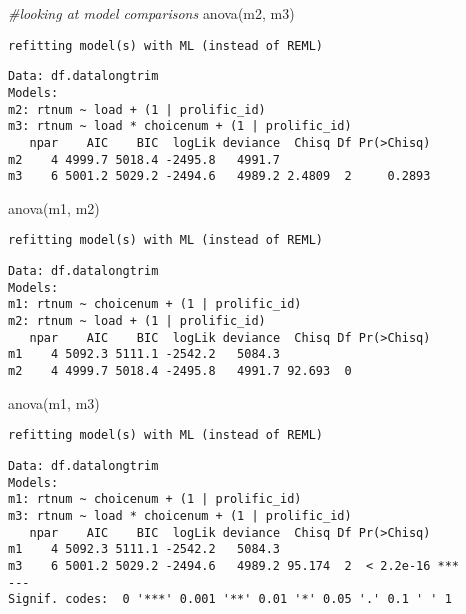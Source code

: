\documentclass[
]{article}
\newenvironment{Shaded}{\begin{snugshade}}{\end{snugshade}}
\newcommand{\CommentTok}[1]{\textcolor[rgb]{0.56,0.35,0.01}{\textit{#1}}}
\newcommand{\FunctionTok}[1]{\textcolor[rgb]{0.00,0.00,0.00}{#1}}
\newcommand{\NormalTok}[1]{#1}
\begin{document}
\begin{Shaded}
\begin{Highlighting}[]
\CommentTok{\#looking at model comparisons}
\FunctionTok{anova}\NormalTok{(m2, m3)}
\end{Highlighting}
\end{Shaded}

\begin{verbatim}
refitting model(s) with ML (instead of REML)
\end{verbatim}

\begin{verbatim}
Data: df.datalongtrim
Models:
m2: rtnum ~ load + (1 | prolific_id)
m3: rtnum ~ load * choicenum + (1 | prolific_id)
   npar    AIC    BIC  logLik deviance  Chisq Df Pr(>Chisq)
m2    4 4999.7 5018.4 -2495.8   4991.7                     
m3    6 5001.2 5029.2 -2494.6   4989.2 2.4809  2     0.2893
\end{verbatim}

\begin{Shaded}
\begin{Highlighting}[]
\FunctionTok{anova}\NormalTok{(m1, m2)}
\end{Highlighting}
\end{Shaded}

\begin{verbatim}
refitting model(s) with ML (instead of REML)
\end{verbatim}

\begin{verbatim}
Data: df.datalongtrim
Models:
m1: rtnum ~ choicenum + (1 | prolific_id)
m2: rtnum ~ load + (1 | prolific_id)
   npar    AIC    BIC  logLik deviance  Chisq Df Pr(>Chisq)
m1    4 5092.3 5111.1 -2542.2   5084.3                     
m2    4 4999.7 5018.4 -2495.8   4991.7 92.693  0           
\end{verbatim}

\begin{Shaded}
\begin{Highlighting}[]
\FunctionTok{anova}\NormalTok{(m1, m3)}
\end{Highlighting}
\end{Shaded}

\begin{verbatim}
refitting model(s) with ML (instead of REML)
\end{verbatim}

\begin{verbatim}
Data: df.datalongtrim
Models:
m1: rtnum ~ choicenum + (1 | prolific_id)
m3: rtnum ~ load * choicenum + (1 | prolific_id)
   npar    AIC    BIC  logLik deviance  Chisq Df Pr(>Chisq)    
m1    4 5092.3 5111.1 -2542.2   5084.3                         
m3    6 5001.2 5029.2 -2494.6   4989.2 95.174  2  < 2.2e-16 ***
---
Signif. codes:  0 '***' 0.001 '**' 0.01 '*' 0.05 '.' 0.1 ' ' 1
\end{verbatim}
\end{document}
